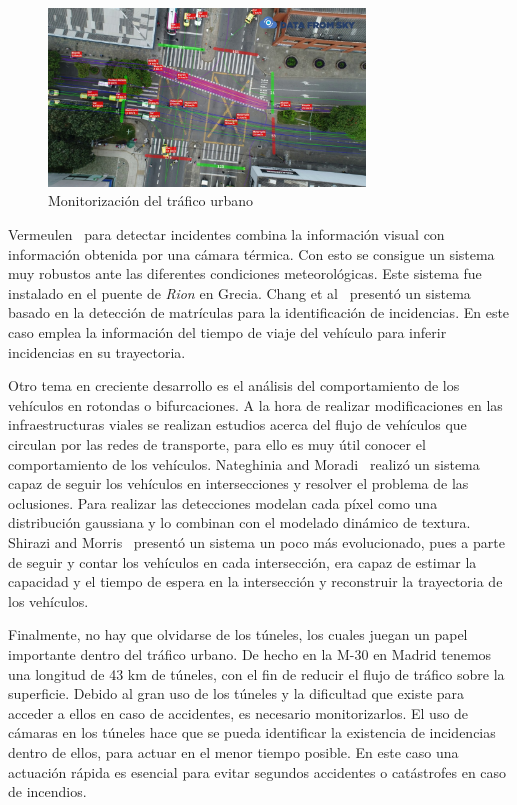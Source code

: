 \begin{figure}[H]
  \begin{center}
    \includegraphics[width=0.75\textwidth]{figures/Introduccion/monitorizacion_trafico_urbano.jpg}
		\caption{Monitorización del tráfico urbano}
		\label{fig.monitorizacion_trafico_urbano}
		\end{center}
\end{figure}

Vermeulen~\cite{automatic_incident} para detectar incidentes combina la información visual con información obtenida por una cámara térmica. Con esto se consigue un sistema muy robustos ante las diferentes condiciones meteorológicas. Este sistema fue instalado en el puente de \textit{Rion} en Grecia. Chang et al~\cite{new_traffic_incident} presentó un sistema basado en la detección de matrículas para la identificación de incidencias. En este caso emplea la información del tiempo de viaje del vehículo para inferir incidencias en su trayectoria.

Otro tema en creciente desarrollo es el análisis del comportamiento de los vehículos en rotondas o bifurcaciones. A la hora de realizar modificaciones en las infraestructuras viales se realizan estudios acerca del flujo de vehículos que circulan por las redes de transporte, para ello es muy útil conocer el comportamiento de los vehículos. Nateghinia and Moradi~\cite{video_based_multiple} realizó un sistema capaz de seguir los vehículos en intersecciones y resolver el problema de las oclusiones. Para realizar las detecciones modelan cada píxel como una distribución gaussiana y lo combinan con el modelado dinámico de  textura. Shirazi and Morris~\cite{vision_based_turning} presentó un sistema un poco más evolucionado, pues a parte de seguir y contar los vehículos en cada intersección, era capaz de estimar la capacidad y el tiempo de espera en la intersección y reconstruir la trayectoria de los vehículos.

Finalmente, no hay que olvidarse de los túneles, los cuales juegan un papel importante dentro del tráfico urbano. De hecho en la M-30 en Madrid tenemos una longitud de 43 km de túneles, con el fin de reducir el flujo de tráfico sobre la superficie. Debido al gran uso de los túneles y la dificultad que existe para acceder a ellos en caso de accidentes, es necesario monitorizarlos. El uso de cámaras en los túneles hace que se pueda identificar la existencia de incidencias dentro de ellos, para actuar en el menor tiempo posible. En este caso una actuación rápida es esencial para evitar segundos accidentes o catástrofes en caso de incendios.

